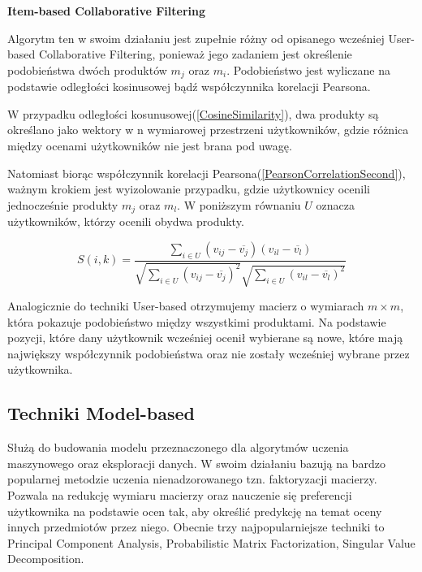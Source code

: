 \textbf{Item-based Collaborative Filtering}

Algorytm ten w swoim działaniu jest zupełnie różny od opisanego wcześniej User-based Collaborative Filtering, ponieważ jego zadaniem jest określenie podobieństwa dwóch produktów $m_j$ oraz $m_i$. Podobieństwo jest wyliczane na podstawie odległości kosinusowej bądź współczynnika korelacji Pearsona.

W przypadku odległości kosunusowej(\ref{CosineSimilarity}), dwa produkty są określano jako wektory w n wymiarowej przestrzeni użytkowników, gdzie różnica między ocenami użytkowników nie jest brana pod uwagę. 

Natomiast biorąc współczynnik korelacji Pearsona(\ref{PearsonCorrelationSecond}), ważnym krokiem jest wyizolowanie przypadku, gdzie użytkownicy ocenili jednocześnie produkty $m_j$ oraz $m_l$. W poniższym równaniu $U$ oznacza użytkowników, którzy ocenili obydwa produkty. 

\begin{equation}
\label{PearsonCorrelationSecond}
S(i,k) = \frac{
	\sum_{i \in U} (v_{ij} - \overline{v_j}) (v_{il} - \overline{v_l})
}{
	\sqrt{
		\sum_{i \in U} (v_{ij} - \overline{v_j})^2 
	}
	\sqrt{
	\sum_{i \in U} (v_{il} - \overline{v_l})^2
	}
}
\end{equation}

Analogicznie do techniki User-based otrzymujemy macierz o wymiarach $m \times m$, która pokazuje podobieństwo między wszystkimi produktami. Na podstawie pozycji, które dany użytkownik wcześniej ocenił wybierane są nowe, które mają największy współczynnik podobieństwa oraz nie zostały wcześniej wybrane przez użytkownika.

\newpage

\subsection{Techniki Model-based}

Służą do budowania modelu przeznaczonego dla algorytmów uczenia maszynowego oraz eksploracji danych. W swoim działaniu bazują na bardzo popularnej metodzie uczenia nienadzorowanego tzn. faktoryzacji macierzy. Pozwala na redukcję wymiaru macierzy oraz nauczenie się preferencji użytkownika na podstawie ocen tak, aby określić predykcję na temat oceny innych przedmiotów przez niego. Obecnie trzy najpopularniejsze techniki to Principal Component Analysis, Probabilistic Matrix Factorization, Singular Value Decomposition. 

\bigskip

